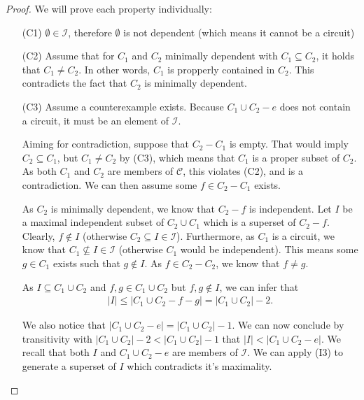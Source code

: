 \begin{proof} We will prove each property individually:
  
\begin{enumerate}
    \item[(C1)] $\emptyset \in \mathcal I$, therefore $\emptyset$ is not dependent (which means it cannot be a circuit)
    \item[(C2)] Assume that for $C_1$ and $C_2$ minimally dependent with $C_1\subseteq C_2$, it holds that $C_1\neq C_2$. In other words, $C_1$ is propperly contained in $C_2$. This contradicts the fact that $C_2$ is minimally dependent.
    \item[(C3)] Assume a counterexample exists. Because $C _1 \cup C _2 - e$ does not contain a circuit, it must be an element of $\mathcal I$. 

        Aiming for contradiction, suppose that $C _2 - C _1$ is empty. That would imply $C _2 \subseteq C _1$, but $C _1 \neq C _2 $ by (C3), which means that $C _1 $ is a proper subset of $C _2$. As both $C _1 $ and $C _2 $ are members of $\mathcal C$, this violates (C2), and is a contradiction. We can then assume some $f \in C _2 - C _1 $ exists.

        As $C _2$ is minimally dependent, we know that $C _2 - f$ is independent. Let $I$ be a maximal independent subset of $C _2 \cup C _1$ which is a superset of $C _2 - f$. Clearly, $f \not\in I$ (otherwise $C _2 \subseteq I \in \mathcal I$). Furthermore, as $C _1 $ is a circuit, we know that $C _1 \not \subseteq I \in \mathcal I$ (otherwise $C _1$ would be independent). This means some $g \in C _1$ exists such that $g \not\in I$. As $f \in C _2  -  C _2$, we know that $f \neq g$.

        As $I \subseteq C _1 \cup C _2$ and $f, g \in C _1 \cup C _2$ but $f, g \not\in I$, we can infer that 
        \begin{align*}
        |I| \leq |C _1 \cup C _2 - f - g| = |C _1 \cup C _2| - 2.
        \end{align*}

        We also notice that $|C _1 \cup C _2 - e| = |C _1 \cup C _2 | - 1$. We can now conclude by transitivity with $|C _1 \cup C _2 | - 2 < |C _1 \cup C _2 | - 1$ that $|I| < |C _1 \cup C _2 - e|$. We recall that both $I$ and $C _1 \cup C _2 - e$ are members of $\mathcal I$. We can apply (I3) to generate a superset of $I$ which contradicts it's maximality.
\end{enumerate}
\end{proof}

